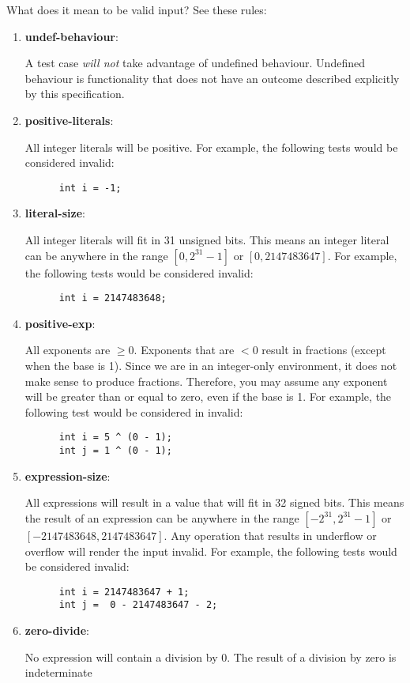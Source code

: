 \documentclass{article}
\newcommand{\assertiondest}[1]{\hypertarget{#1}{\textbf{#1}:}}
\begin{document}
What does it mean to be valid input? See these rules:
\begin{enumerate}
  \item
    \assertiondest{undef-behaviour}
    A test case \textit{will not} take advantage of undefined behaviour. Undefined behaviour is
    functionality that does not have an outcome described explicitly by this specification.
  \item
    \assertiondest{positive-literals}
    All integer literals will be positive. For example, the following tests would be considered
    invalid:
    \begin{lstlisting}
      int i = -1;
    \end{lstlisting}
  \item
    \assertiondest{literal-size}
    All integer literals will fit in 31 unsigned bits. This means an integer literal can be
    anywhere in the range $[0, 2^{31} - 1]$ or $[0, 2147483647]$. For example, the following tests
    would be considered invalid:
    \begin{lstlisting}
      int i = 2147483648;
    \end{lstlisting}
  \item
    \assertiondest{positive-exp}
    All exponents are $\geq 0$. Exponents that are $< 0$ result in fractions (except when the
    base is 1). Since we are in an integer-only environment, it does not make sense to produce
    fractions. Therefore, you may assume any exponent will be greater than or equal to zero, even
    if the base is 1. For example, the following test would be considered in invalid:
    \begin{lstlisting}
      int i = 5 ^ (0 - 1);
      int j = 1 ^ (0 - 1);
    \end{lstlisting}
  \item
    \assertiondest{expression-size}
    All expressions will result in a value that will fit in 32 signed bits. This means the result
    of an expression can be anywhere in the range $[-2^{31}, 2^{31} - 1]$ or $[-2147483648,
    2147483647]$. Any operation that results in underflow or overflow will render the input
    invalid. For example, the following tests would be considered invalid:
    \begin{lstlisting}
      int i = 2147483647 + 1;
      int j =  0 - 2147483647 - 2;
    \end{lstlisting}
  \item
    \assertiondest{zero-divide}
    No expression will contain a division by 0. The result of a division by zero is indeterminate

\end{enumerate}
\end{document}
